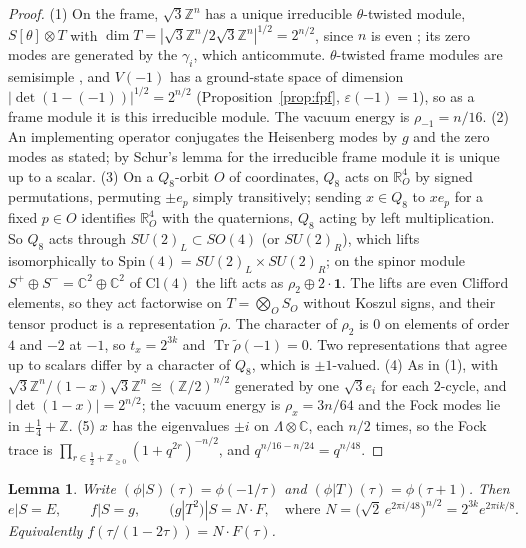 \documentclass[11pt]{amsart}
\newtheorem{lemma}[theorem]{Lemma}
\theoremstyle{definition}
\newcommand{\Z}{\mathbb{Z}}
\newcommand{\C}{\mathbb{C}}
\newcommand{\R}{\mathbb{R}}
\newcommand{\Tr}{\operatorname{Tr}}
\begin{document}
\begin{proof}
(1) On the frame, $\sqrt3\Z^n$ has a unique irreducible $\theta$-twisted module, $S[\theta]\otimes T$ with
$\dim T=|\sqrt3\Z^n/2\sqrt3\Z^n|^{1/2}=2^{n/2}$, since $n$ is even \cite[Thm.~4.2, Rem.~4.4]{BK}; its
zero modes are generated by the $\gamma_i$, which anticommute. $\theta$-twisted frame modules are
semisimple \cite[Thm.~4.2]{BK}, and $V(-1)$ has a ground-state space of dimension
$|\det(1-(-1))|^{1/2}=2^{n/2}$ (Proposition~\ref{prop:fpf}, $\varepsilon(-1)=1$), so as a frame module it
is this irreducible module. The vacuum energy is $\rho_{-1}=n/16$. (2) An implementing operator
conjugates the Heisenberg modes by $g$ and the zero modes as stated; by Schur's lemma for the
irreducible frame module it is unique up to a scalar. (3) On a $Q_8$-orbit $O$ of coordinates, $Q_8$ acts
on $\R^4_O$ by signed permutations, permuting $\pm e_p$ simply transitively; sending $x\in Q_8$ to
$xe_p$ for a fixed $p\in O$ identifies $\R^4_O$ with the quaternions, $Q_8$ acting by left
multiplication. So $Q_8$ acts through $SU(2)_L\subset SO(4)$ (or $SU(2)_R$), which lifts isomorphically
to $\mathrm{Spin}(4)=SU(2)_L\times SU(2)_R$; on the spinor module $S^+\oplus S^-=\C^2\oplus\C^2$ of
$\mathrm{Cl}(4)$ the lift acts as $\rho_2\oplus2\cdot\mathbf 1$. The lifts are even Clifford elements,
so they act factorwise on $T=\bigotimes_OS_O$ without Koszul signs, and their tensor product is a
representation $\tilde\rho$. The character of $\rho_2$ is $0$ on elements of order $4$ and $-2$ at $-1$,
so $t_x=2^{3k}$ and $\Tr\tilde\rho(-1)=0$. Two representations that agree up to scalars differ by a
character of $Q_8$, which is $\pm1$-valued. (4) As in (1), with $\sqrt3\Z^n/(1-x)\sqrt3\Z^n\cong
(\Z/2)^{n/2}$ generated by one $\sqrt3e_i$ for each $2$-cycle, and $|\det(1-x)|=2^{n/2}$; the vacuum energy
is $\rho_x=3n/64$ and the Fock modes lie in $\pm\frac14+\Z$. (5) $x$ has the eigenvalues $\pm i$ on
$\Lambda\otimes\C$, each $n/2$ times, so the Fock trace is $\prod_{r\in\frac12+\Z_{\ge0}}(1+q^{2r})^{-n/2}$,
and $q^{n/16-n/24}=q^{n/48}$.
\end{proof}

\begin{lemma}\label{lem:eta}
Write $(\phi|S)(\tau)=\phi(-1/\tau)$ and $(\phi|T)(\tau)=\phi(\tau+1)$. Then
\[
  e|S=E,\qquad f|S=g,\qquad (g|T^2)|S=N\cdot F,\quad\text{where }
  N=\bigl(\sqrt2\,e^{2\pi i/48}\bigr)^{n/2}=2^{3k}e^{2\pi ik/8}.
\]
Equivalently $f(\tau/(1-2\tau))=N\cdot F(\tau)$.
\end{lemma}
\end{document}
